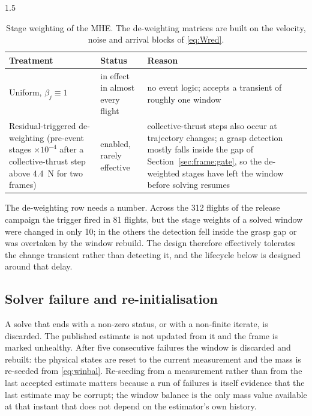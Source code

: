\begin{spacing}{1.5}
\begin{table}[ht]
\centering
\caption{Stage weighting of the MHE. The de-weighting matrices are built on the
velocity, noise and arrival blocks of \eqref{eq:Wred}.}
\label{tab:stageweight}
\small
\begin{tabularx}{\textwidth}{@{}>{\raggedright\arraybackslash}p{} >{\raggedright\arraybackslash}p{} >{\raggedright\arraybackslash}X@{}}
\toprule
Treatment & Status & Reason \\
\midrule
Uniform, $\beta_j\equiv1$ & in effect in almost every flight & no event logic; accepts a transient of roughly one window \\
Residual-triggered de-weighting (pre-event stages $\times10^{-4}$ after a collective-thrust step above \SI{4.4}{\newton} for two frames) & enabled, rarely effective & collective-thrust steps also occur at trajectory changes; a grasp detection mostly falls inside the gap of Section~\ref{sec:frame:gate}, so the de-weighted stages have left the window before solving resumes \\
\bottomrule
\end{tabularx}
\end{table}

The de-weighting row needs a number. Across the 312 flights of the release
campaign the trigger fired in 81 flights, but the stage weights of a solved
window were changed in only 10; in the others the detection fell inside the
grasp gap or was overtaken by the window rebuild. The design therefore effectively tolerates the change transient rather than detecting it,
and the lifecycle below is designed around that delay.

\subsection{Solver failure and re-initialisation}\label{sec:frame:reanchor}

A solve that ends with a non-zero status, or with a non-finite iterate, is
discarded. The published estimate is not updated from it and the frame is marked
unhealthy. After five consecutive failures the window is discarded and rebuilt:
the physical states are reset to the current measurement and the mass is
re-seeded from \eqref{eq:winbal}. Re-seeding from a measurement rather than from
the last accepted estimate matters because a run of failures is itself evidence
that the last estimate may be corrupt; the window balance is the only mass value
available at that instant that does not depend on the estimator's own history.


\end{spacing}
